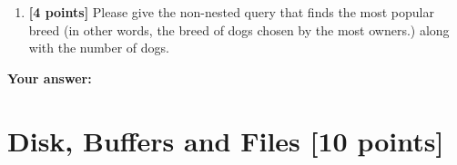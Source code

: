 \documentclass[10pt]{article}
\begin{document}
\begin{enumerate}
	\item \textbf{[4 points]}
	      Please give the non-nested query that finds the most popular breed
	      (in other words, the breed of dogs chosen by the most owners.) along with the number of dogs.


\end{enumerate}
\textbf{Your answer:}



\newpage
\section{Disk, Buffers and Files \textbf{[10 points]}}
\end{document}
